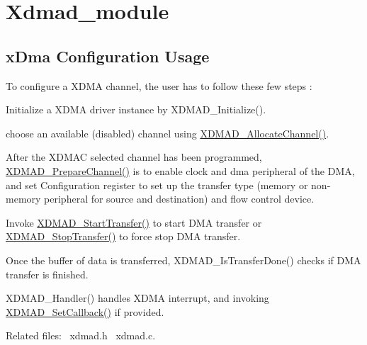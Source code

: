 \hypertarget{group__xdmad__module}{}\section{Xdmad\+\_\+module}
\label{group__xdmad__module}
\hypertarget{group__xdmad__module_Xdma}{}\subsection{x\+Dma Configuration Usage}\label{group__xdmad__module_Xdma}
To configure a X\+D\+MA channel, the user has to follow these few steps \+: 
\begin{DoxyItemize}
\item Initialize a X\+D\+MA driver instance by X\+D\+M\+A\+D\+\_\+\+Initialize(). 
\item choose an available (disabled) channel using \mbox{\hyperlink{group__dmad__functions_gaafb596e6912f388050a8ff98f54b8b8f}{X\+D\+M\+A\+D\+\_\+\+Allocate\+Channel()}}. 
\item After the X\+D\+M\+AC selected channel has been programmed, \mbox{\hyperlink{group__dmad__functions_ga2a7947467c04eb39abee2471d846ee35}{X\+D\+M\+A\+D\+\_\+\+Prepare\+Channel()}} is to enable clock and dma peripheral of the D\+MA, and set Configuration register to set up the transfer type (memory or non-\/memory peripheral for source and destination) and flow control device. 
\item Invoke \mbox{\hyperlink{group__dmad__functions_ga20bc2d5f85c7145a43d7ccd13b067e50}{X\+D\+M\+A\+D\+\_\+\+Start\+Transfer()}} to start D\+MA transfer or \mbox{\hyperlink{group__dmad__functions_ga6be5cec75618250adb227d7588ae7078}{X\+D\+M\+A\+D\+\_\+\+Stop\+Transfer()}} to force stop D\+MA transfer. 
\item Once the buffer of data is transferred, X\+D\+M\+A\+D\+\_\+\+Is\+Transfer\+Done() checks if D\+MA transfer is finished. 
\item X\+D\+M\+A\+D\+\_\+\+Handler() handles X\+D\+MA interrupt, and invoking \mbox{\hyperlink{group__dmad__functions_gaa0af49f87c84aaa20bee1f055d31ad2d}{X\+D\+M\+A\+D\+\_\+\+Set\+Callback()}} if provided. 
\end{DoxyItemize}

Related files\+:~\newline
xdmad.\+h~\newline
 xdmad.\+c.~\newline
 